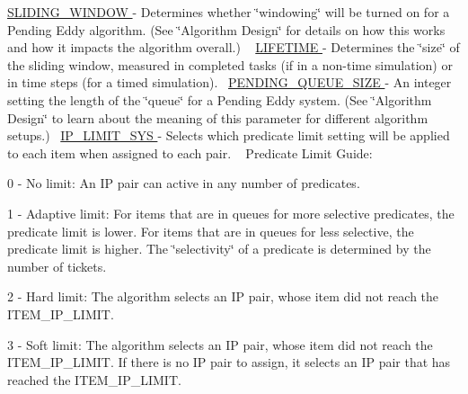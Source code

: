 \hyperlink{namespacedynamicfilterapp_1_1toggles_adf3c8ab64e62d33397a389d7ba49fe69}{S\+L\+I\+D\+I\+N\+G\+\_\+\+W\+I\+N\+D\+OW } -\/ Determines whether \char`\"{}windowing\char`\"{} will be turned on for a Pending Eddy algorithm. (See \char`\"{}\+Algorithm Design\char`\"{} for details on how this works and how it impacts the algorithm overall.) ~\newline
 \hyperlink{namespacedynamicfilterapp_1_1toggles_a06966aed6fa634825f18ad256f386496}{L\+I\+F\+E\+T\+I\+ME }-\/ Determines the \char`\"{}size\char`\"{} of the sliding window, measured in completed tasks (if in a non-\/time simulation) or in time steps (for a timed simulation).~\newline
\hyperlink{namespacedynamicfilterapp_1_1toggles_a642cb0e1f266db761b270ea65af5425a}{P\+E\+N\+D\+I\+N\+G\+\_\+\+Q\+U\+E\+U\+E\+\_\+\+S\+I\+ZE } -\/ An integer setting the length of the \char`\"{}queue\char`\"{} for a Pending Eddy system. (See \char`\"{}\+Algorithm Design\char`\"{} to learn about the meaning of this parameter for different algorithm setups.)~\newline
 \hyperlink{namespacedynamicfilterapp_1_1toggles_ab27926159525360b29661a4778b0ce7c}{I\+P\+\_\+\+L\+I\+M\+I\+T\+\_\+\+S\+YS } -\/ Selects which predicate limit setting will be applied to each item when assigned to each pair. ~\newline
Predicate Limit Guide\+:
\begin{DoxyItemize}
\item 0 -\/ No limit\+: An IP pair can active in any number of predicates.
\item 1 -\/ Adaptive limit\+: For items that are in queues for more selective predicates, the predicate limit is lower. For items that are in queues for less selective, the predicate limit is higher. The \char`\"{}selectivity\char`\"{} of a predicate is determined by the number of tickets.
\item 2 -\/ Hard limit\+: The algorithm selects an IP pair, whose item did not reach the I\+T\+E\+M\+\_\+\+I\+P\+\_\+\+L\+I\+M\+IT.
\item 3 -\/ Soft limit\+: The algorithm selects an IP pair, whose item did not reach the I\+T\+E\+M\+\_\+\+I\+P\+\_\+\+L\+I\+M\+IT. If there is no IP pair to assign, it selects an IP pair that has reached the I\+T\+E\+M\+\_\+\+I\+P\+\_\+\+L\+I\+M\+IT.
\end{DoxyItemize}

